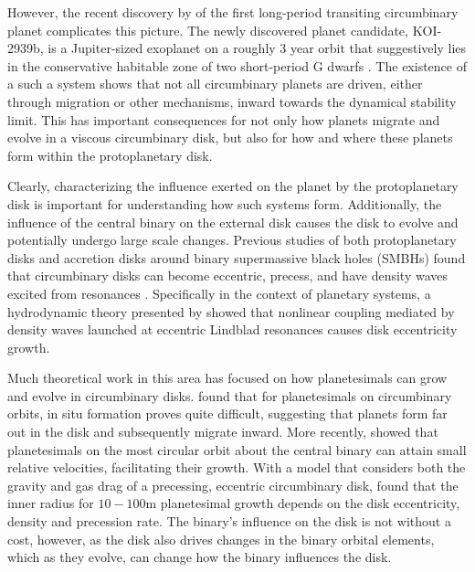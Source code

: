 However, the recent discovery by \citet{Kostov2016} of the first long-period transiting circumbinary planet complicates this picture.  The newly discovered planet candidate, KOI-2939b, is a Jupiter-sized exoplanet on a roughly 3 year orbit that suggestively lies in the conservative habitable zone of two short-period G dwarfs \citep{Kostov2016}.  The existence of a such a system shows that not all circumbinary planets are driven, either through migration or other mechanisms, inward towards the dynamical stability limit.  This has important consequences for not only how planets migrate and evolve in a viscous circumbinary disk, but also for how and where these planets form within the protoplanetary disk.

Clearly, characterizing the influence exerted on the planet by the protoplanetary disk is important for understanding how such systems form.  Additionally, the influence of the central binary on the external disk causes the disk to evolve and potentially undergo large scale changes.  Previous studies of both protoplanetary disks and accretion disks around binary supermassive black holes (SMBHs) found that circumbinary disks can become eccentric, precess, and have density waves excited from resonances \citep{Dunhill2015,MacFadyen2008,Papaloizou2001,Pierens2007,Pierens2013,Roedig2012}.  Specifically in the context of planetary systems, a hydrodynamic theory presented by \citet{Lubow1991} showed that nonlinear coupling mediated by density waves launched at eccentric Lindblad resonances causes disk eccentricity growth. 

Much theoretical work in this area has focused on how planetesimals
can grow and evolve in circumbinary disks.  \citet{Paardekooper2012}
found that for planetesimals on circumbinary orbits, in situ formation
proves quite difficult, suggesting that planets form far out in the
disk and subsequently migrate inward.  More recently, \citet{Bromley2015}
showed that planetesimals on the most circular orbit about the central
binary can attain small relative velocities, facilitating their growth.
With a model that considers both the gravity and gas drag of a
precessing, eccentric circumbinary disk, \citet{Silsbee2015a} found that
the inner radius for $10-100$m planetesimal growth depends on the disk eccentricity, density and precession rate.  The binary's influence on the disk is not without a cost, however, as the disk also drives changes in the binary orbital elements, which as they evolve, can change how the binary influences the disk.

